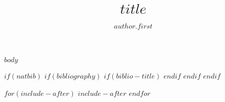 \documentclass[defaultstyle,11pt]{$documentclass$}
\title{$title$}
\author{$author.first$}{$author.last$}
\begin{document}
$body$





$if(natbib)$
$if(bibliography)$
$if(biblio-title)$
\renewcommand\refname{$biblio-title$}
$endif$
%
$endif$
$endif$


$for(include-after)$
$include-after$
$endfor$
\end{document}

